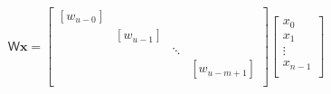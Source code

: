 \documentclass[preview,border=10pt]{standalone}
\begin{document}
\begin{equation*}
    \mathsf{W} \bm{x} =      
    \begin{bmatrix} 
        [w_{u-0}]  \\
        & [w_{u-1}]  \\
        && \ddots  \\
        &&& [w_{u-m+1}]  \\
    \end{bmatrix} 
    \begin{bmatrix}
        x_{0} \\
        x_{1} \\
        \vdots   \\
        x_{n-1} \\
    \end{bmatrix}
\end{equation*}
\end{document}
